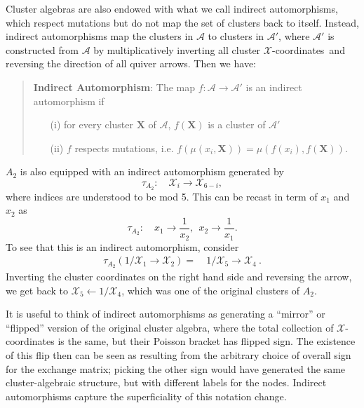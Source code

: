 \documentclass[11pt]{article}
\def\x{\mathcal{X}}
\def\xcoords{$\mathcal{X}$-coordinates}
\def\a{\mathcal{A}}
\begin{document}
Cluster algebras are also endowed with what we call indirect automorphisms, which respect mutations but do not map the set of clusters back to itself. Instead, indirect automorphisms map the clusters in $\a$ to clusters in $\a'$, where $\a'$ is constructed from $\a$ by multiplicatively inverting all cluster \xcoords\ and reversing the direction of all quiver arrows. Then we have:
\begin{quote}
{\bf Indirect Automorphism}: The map $f: \a \to \a'$ is an indirect automorphism if 
\vspace{-.2cm}
\begin{itemize}
  \item[(i)] for every cluster $\mathbf{X}$ of $\a$, $f(\mathbf{X})$ is a cluster of $\a'$ 
  \item[(ii)] $f$ respects mutations, i.e. $f(\mu(x_i,\mathbf{X})) = \mu(f(x_i),f(\mathbf{X}))$.
\end{itemize}
\end{quote}
$A_2$ is also equipped with an indirect automorphism generated by
\begin{equation}
  \tau_{A_2}:\quad \mathcal{X}_i \to \mathcal{X}_{6-i},
\end{equation}
where indices are understood to be mod 5. This can be recast in term of $x_1$ and $x_2$ as
\begin{equation}
  \tau_{A_2}:\quad x_1 \to \frac{1}{x_2}, ~~x_2 \to \frac{1}{x_1}.
\end{equation}
To see that this is an indirect automorphism, consider
\begin{align}
  \tau_{A_2}(1/\x_1 \to \x_2) =&~1/\x_5 \to \x_4 \ .
\end{align}
Inverting the cluster coordinates on the right hand side and reversing the arrow, we get back to $\x_5 \leftarrow 1/\x_4$, which was one of the original clusters of $A_2$. 

It is useful to think of indirect automorphisms as generating a ``mirror'' or ``flipped'' version of the original cluster algebra, where the total collection of $\x$-coordinates is the same, but their Poisson bracket has flipped sign. The existence of this flip then can be seen as resulting from the arbitrary choice of overall sign for the exchange matrix; picking the other sign would have generated the same cluster-algebraic structure, but with different labels for the nodes. Indirect automorphisms capture the superficiality of this notation change.
\end{document}
